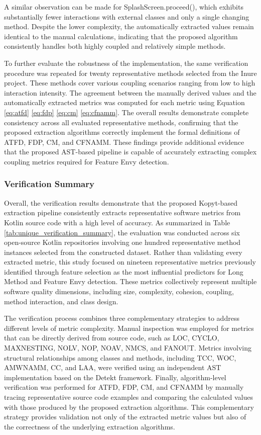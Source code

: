 \documentclass[]{einformatica}
\begin{document}
A similar observation can be made for SplashScreen.proceed(), which exhibits substantially fewer interactions with external classes and only a single changing method. Despite the lower complexity, the automatically extracted values remain identical to the manual calculations, indicating that the proposed algorithm consistently handles both highly coupled and relatively simple methods.

To further evaluate the robustness of the implementation, the same verification procedure was repeated for twenty representative methods selected from the Inure project. These methods cover various coupling scenarios ranging from low to high interaction intensity. The agreement between the manually derived values and the automatically extracted metrics was computed for each metric using Equation \ref{eq:atfd} \ref{eq:fdp} \ref{eq:cm} \ref{eq:cfnamm}. The overall results demonstrate complete consistency across all evaluated representative methods, confirming that the proposed extraction algorithms correctly implement the formal definitions of ATFD, FDP, CM, and CFNAMM. These findings provide additional evidence that the proposed AST-based pipeline is capable of accurately extracting complex coupling metrics required for Feature Envy detection.

\subsubsection{Verification Summary}

Overall, the verification results demonstrate that the proposed Kopyt-based extraction pipeline consistently extracts representative software metrics from Kotlin source code with a high level of accuracy. As summarized in Table \ref{tab:unique_verification_summary}, the evaluation was conducted across six open-source Kotlin repositories involving one hundred representative method instances selected from the constructed dataset. Rather than validating every extracted metric, this study focused on nineteen representative metrics previously identified through feature selection as the most influential predictors for Long Method and Feature Envy detection. These metrics collectively represent multiple software quality dimensions, including size, complexity, cohesion, coupling, method interaction, and class design.

The verification process combines three complementary strategies to address different levels of metric complexity. Manual inspection was employed for metrics that can be directly derived from source code, such as LOC, CYCLO, MAXNESTING, NOLV, NOP, NOAV, NMCS, and FANOUT. Metrics involving structural relationships among classes and methods, including TCC, WOC, AMWNAMM, CC, and LAA, were verified using an independent AST implementation based on the Detekt framework. Finally, algorithm-level verification was performed for ATFD, FDP, CM, and CFNAMM by manually tracing representative source code examples and comparing the calculated values with those produced by the proposed extraction algorithms. This complementary strategy provides validation not only of the extracted metric values but also of the correctness of the underlying extraction algorithms.
\end{document}
